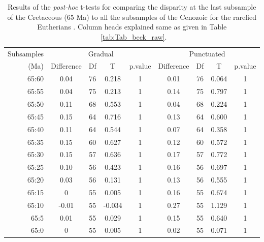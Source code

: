 \documentclass[12pt,letterpaper]{article}
\begin{document}
\begin{table}[!ht]
\caption{Results of the \textit{post-hoc} t-tests for comparing the disparity at the last subsample of the Cretaceous (65 Ma) to all the subsamples of the Cenozoic for the rarefied Eutherians \citep[data from][]{beckancient2014}. Column heads explained same as given in Table ~\ref{tab:Tab_beck_raw}.}
\label{tab:Tab_beck_rar}
\centering
\begin{tabular}{r|cccc|cccc}
  \hline
  Subsamples & \multicolumn{4}{c|}{Gradual} & \multicolumn{4}{c}{Punctuated} \\
  (Ma) & Difference & Df & T & p.value & Difference & Df & T & p.value \\ 
  \hline
  65:60 & 0.04  & 76 & 0.218  & 1 & 0.01 & 76 & 0.064 & 1 \\ 
  65:55 & 0.04  & 75 & 0.213  & 1 & 0.14 & 75 & 0.797 & 1 \\ 
  65:50 & 0.11  & 68 & 0.553  & 1 & 0.04 & 68 & 0.224 & 1 \\ 
  65:45 & 0.15  & 64 & 0.716  & 1 & 0.13 & 64 & 0.600 & 1 \\ 
  65:40 & 0.11  & 64 & 0.544  & 1 & 0.07 & 64 & 0.358 & 1 \\ 
  65:35 & 0.15  & 60 & 0.627  & 1 & 0.12 & 60 & 0.572 & 1 \\ 
  65:30 & 0.15  & 57 & 0.636  & 1 & 0.17 & 57 & 0.772 & 1 \\ 
  65:25 & 0.10  & 56 & 0.423  & 1 & 0.16 & 56 & 0.697 & 1 \\ 
  65:20 & 0.03  & 56 & 0.131  & 1 & 0.13 & 56 & 0.555 & 1 \\ 
  65:15 & 0     & 55 & 0.005  & 1 & 0.16 & 55 & 0.674 & 1 \\ 
  65:10 & -0.01 & 55 & -0.034 & 1 & 0.27 & 55 & 1.129 & 1 \\ 
  65:5  & 0.01  & 55 & 0.029  & 1 & 0.15 & 55 & 0.640 & 1 \\ 
  65:0  & 0     & 55 & 0.005  & 1 & 0.02 & 55 & 0.071 & 1 \\
   \hline
\end{tabular}
\end{table}
\end{document}
